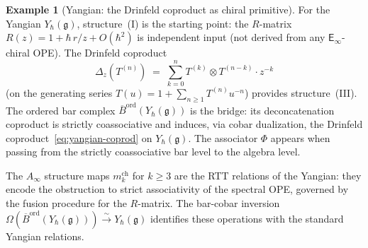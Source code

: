 \documentclass[11pt,reqno]{amsart}
\theoremstyle{definition}
\newtheorem{example}[theorem]{Example}
\theoremstyle{remark}
\newcommand{\Ainf}{A_{\infty}}
\newcommand{\Einf}{\mathsf{E}_{\infty}}
\newcommand{\fg}{\mathfrak{g}}
\newcommand{\Barord}{\overline{B}^{\mathrm{ord}}}
\numberwithin{equation}{section}
\begin{document}
\begin{example}[Yangian: the Drinfeld coproduct as chiral
primitive]
\label{ex:yangian-coproduct}
For the Yangian $Y_\hbar(\fg)$, structure~(I) is the
starting point: the $R$-matrix
$R(z) = 1 + \hbar\, r/z + O(\hbar^2)$ is independent
input (not derived from any $\Einf$-chiral OPE). The
Drinfeld coproduct
\begin{equation}\label{eq:yangian-coprod}
  \Delta_z(T^{(n)})
  \;=\; \sum_{k=0}^{n}
  T^{(k)} \otimes T^{(n-k)} \cdot z^{-k}
\end{equation}
(on the generating series
$T(u) = 1 + \sum_{n \geq 1} T^{(n)} u^{-n}$) provides
structure~(III). The ordered bar complex
$\Barord(Y_\hbar(\fg))$ is the bridge: its
deconcatenation coproduct is strictly coassociative and
induces, via cobar dualization, the Drinfeld
coproduct~\eqref{eq:yangian-coprod} on $Y_\hbar(\fg)$.
The associator $\Phi$ appears when passing from the strictly
coassociative bar level to the algebra level.

The $\Ainf$ structure maps $m_k^{\mathrm{ch}}$ for
$k \geq 3$ are the RTT relations of the Yangian: they
encode the obstruction to strict associativity of the
spectral OPE, governed by the fusion procedure for the
$R$-matrix. The bar-cobar inversion
$\Omega(\Barord(Y_\hbar(\fg))) \xrightarrow{\sim}
Y_\hbar(\fg)$ identifies these operations with the
standard Yangian relations.
\end{example}
\end{document}
